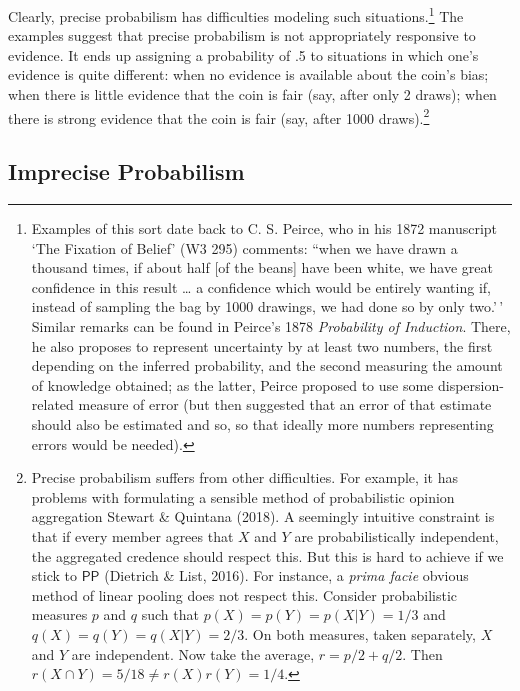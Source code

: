 \documentclass[
  10pt,
  dvipsnames,enabledeprecatedfontcommands]{scrartcl}
\newcommand{\s}[1]{\mbox{$\mathsf{#1}$}}
\begin{document}

\noindent Clearly, precise probabilism has difficulties modeling such
situations.\footnote{Examples of this sort date back to C. S. Peirce,
  who in his 1872 manuscript `The Fixation of Belief' (W3 295) comments:
  ``when we have drawn a thousand times, if about half {[}of the
  beans{]} have been white, we have great confidence in this result
  \ldots{} a confidence which would be entirely wanting if, instead of
  sampling the bag by 1000 drawings, we had done so by only two.'\,'
  Similar remarks can be found in Peirce's 1878
  \emph{Probability of Induction}. There, he also proposes to represent
  uncertainty by at least two numbers, the first depending on the
  inferred probability, and the second measuring the amount of knowledge
  obtained; as the latter, Peirce proposed to use some
  dispersion-related measure of error (but then suggested that an error
  of that estimate should also be estimated and so, so that ideally more
  numbers representing errors would be needed).} The examples suggest
that precise probabilism is not appropriately responsive to evidence. It
ends up assigning a probability of .5 to situations in which one's
evidence is quite different: when no evidence is available about the
coin's bias; when there is little evidence that the coin is fair (say,
after only 2 draws); when there is strong evidence that the coin is fair
(say, after 1000 draws).\footnote{Precise probabilism suffers from other
  difficulties. For example, it has problems with formulating a sensible
  method of probabilistic opinion aggregation Stewart \& Quintana
  (2018). A seemingly intuitive constraint is that if every member
  agrees that \(X\) and \(Y\) are probabilistically independent, the
  aggregated credence should respect this. But this is hard to achieve
  if we stick to \s{PP} (Dietrich \& List, 2016). For instance, a
  \emph{prima facie} obvious method of linear pooling does not respect
  this. Consider probabilistic measures \(p\) and \(q\) such that
  \(p(X) = p(Y) = p(X\vert Y) = 1/3\) and
  \(q(X) = q(Y) = q(X\vert Y) = 2/3\). On both measures, taken
  separately, \(X\) and \(Y\) are independent. Now take the average,
  \(r=p/2+q/2\). Then \(r(X\cap Y) = 5/18 \neq r(X)r(Y)=1/4\).}

\hypertarget{imprecise-probabilism}{%
\subsection{Imprecise Probabilism}\label{imprecise-probabilism}}
\end{document}
